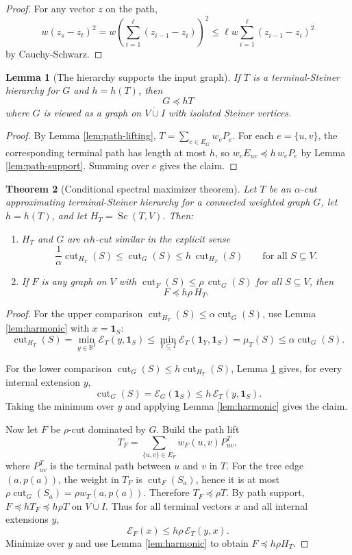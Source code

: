 \documentclass[11pt]{article}
\newtheorem{theorem}{Theorem}[section]
\newtheorem{lemma}[theorem]{Lemma}
\newcommand{\R}{\mathbb{R}}
\newcommand{\cut}{\operatorname{cut}}
\newcommand{\Sc}{\operatorname{Sc}}
\newcommand{\E}{\mathcal{E}}
\begin{document}
\begin{proof}
For any vector $z$ on the path,
\[
  w(z_s-z_t)^2
  =
  w\left(\sum_{i=1}^{\ell}(z_{i-1}-z_i)\right)^2
  \le
  \ell w\sum_{i=1}^{\ell}(z_{i-1}-z_i)^2
\]
by Cauchy-Schwarz.
\end{proof}

\begin{lemma}[The hierarchy supports the input graph]
\label{lem:G-supported}
If $T$ is a terminal-Steiner hierarchy for $G$ and $h=h(T)$, then
\[
  G\preceq hT
\]
where $G$ is viewed as a graph on $V\dot\cup I$ with isolated Steiner
vertices.
\end{lemma}

\begin{proof}
By Lemma \ref{lem:path-lifting}, $T=\sum_{e\in E_G} w_eP_e$.  For each
$e=\{u,v\}$, the corresponding terminal path has length at most $h$, so
$w_eE_{uv}\preceq h\,w_eP_e$ by Lemma \ref{lem:path-support}.  Summing over
$e$ gives the claim.
\end{proof}

\begin{theorem}[Conditional spectral maximizer theorem]
\label{thm:conditional-max}
Let $T$ be an $\alpha$-cut approximating terminal-Steiner hierarchy for a
connected weighted graph $G$, let $h=h(T)$, and let $H_T=\Sc(T,V)$.
Then:
\begin{enumerate}
\item $H_T$ and $G$ are $\alpha h$-cut similar in the explicit sense
\[
  \frac{1}{\alpha}\cut_{H_T}(S)\le \cut_G(S)
  \le h\,\cut_{H_T}(S)
  \qquad\text{for all }S\subseteq V.
\]
\item If $F$ is any graph on $V$ with
$\cut_F(S)\le \rho\,\cut_G(S)$ for all $S\subseteq V$, then
\[
  F\preceq h\rho\,H_T .
\]
\end{enumerate}
\end{theorem}

\begin{proof}
For the upper comparison $\cut_{H_T}(S)\le \alpha\cut_G(S)$, use Lemma
\ref{lem:harmonic} with $x=\mathbf{1}_S$:
\[
  \cut_{H_T}(S)
  =
  \min_{y\in\R^I}\E_T(y,\mathbf{1}_S)
  \le
  \min_{Y\subseteq I}\E_T(\mathbf{1}_Y,\mathbf{1}_S)
  =
  \mu_T(S)
  \le
  \alpha\cut_G(S).
\]

For the lower comparison $\cut_G(S)\le h\cut_{H_T}(S)$, Lemma
\ref{lem:G-supported} gives, for every internal extension $y$,
\[
  \cut_G(S)=\E_G(\mathbf{1}_S)
  \le h\,\E_T(y,\mathbf{1}_S).
\]
Taking the minimum over $y$ and applying Lemma \ref{lem:harmonic} gives the
claim.

Now let $F$ be $\rho$-cut dominated by $G$.  Build the path lift
\[
  T_F=\sum_{\{u,v\}\in E_F} w_F(u,v)P^T_{uv},
\]
where $P^T_{uv}$ is the terminal path between $u$ and $v$ in $T$.  For the
tree edge $(a,p(a))$, the weight in $T_F$ is $\cut_F(S_a)$, hence it is at
most $\rho\cut_G(S_a)=\rho w_T(a,p(a))$.  Therefore $T_F\preceq \rho T$.
By path support, $F\preceq hT_F\preceq h\rho T$ on $V\dot\cup I$.  Thus for
all terminal vectors $x$ and all internal extensions $y$,
\[
  \E_F(x)\le h\rho\,\E_T(y,x).
\]
Minimize over $y$ and use Lemma \ref{lem:harmonic} to obtain
$F\preceq h\rho H_T$.
\end{proof}
\end{document}
